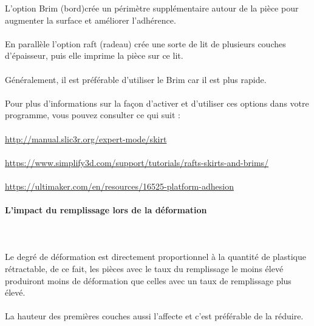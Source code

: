 \documentclass[11pt,a4paper]{article}
\begin{document}
L'option Brim (bord)crée un périmètre supplémentaire autour de la pièce pour augmenter la surface et améliorer l'adhérence.
\\\\
En parallèle l’option raft (radeau) crée une sorte de lit de plusieurs couches d’épaisseur, puis elle imprime la pièce sur ce lit.
\\\\
Généralement, il est préférable d’utiliser le Brim car il est  plus rapide.
\\\\
Pour plus d’informations sur la façon d’activer et d’utiliser ces options dans votre programme, vous pouvez consulter ce qui suit :\\\\
\url{http://manual.slic3r.org/expert-mode/skirt}\\\\
\url{https://www.simplify3d.com/support/tutorials/rafts-skirts-and-brims/}\\\\
\url{https://ultimaker.com/en/resources/16525-platform-adhesion}
			\paragraph{L'impact du remplissage lors de la déformation}\mbox{}\\\\
Le degré de déformation est directement proportionnel à la quantité de plastique rétractable, de ce fait, les pièces avec le taux du remplissage le moins élevé produiront  moins de déformation que celles avec un taux de remplissage plus élevé.
\\\\
La hauteur des premières couches aussi l’affecte et c’est préférable de la réduire.
\end{document}
